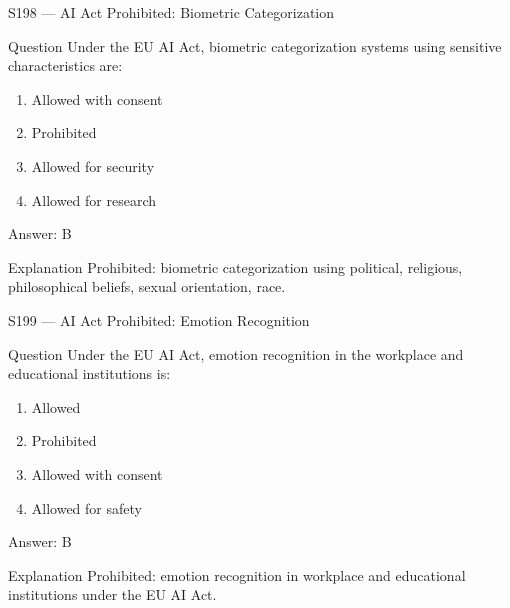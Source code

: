 \documentclass[aspectratio=169,8pt]{beamer}
\begin{document}
\begin{frame}{S198 --- AI Act Prohibited: Biometric Categorization}
	\begin{block}{Question}
		Under the EU AI Act, biometric categorization systems using sensitive characteristics are:
		\begin{enumerate}
			\item Allowed with consent
			\item Prohibited
			\item Allowed for security
			\item Allowed for research
		\end{enumerate}
	\end{block}
	\begin{exampleblock}{Answer: B}\end{exampleblock}
	\begin{block}{Explanation}
		Prohibited: biometric categorization using political, religious, philosophical beliefs, sexual orientation, race.
	\end{block}
\end{frame}

\begin{frame}{S199 --- AI Act Prohibited: Emotion Recognition}
	\begin{block}{Question}
		Under the EU AI Act, emotion recognition in the workplace and educational institutions is:
		\begin{enumerate}
			\item Allowed
			\item Prohibited
			\item Allowed with consent
			\item Allowed for safety
		\end{enumerate}
	\end{block}
	\begin{exampleblock}{Answer: B}\end{exampleblock}
	\begin{block}{Explanation}
		Prohibited: emotion recognition in workplace and educational institutions under the EU AI Act.
	\end{block}
\end{frame}
\end{document}
